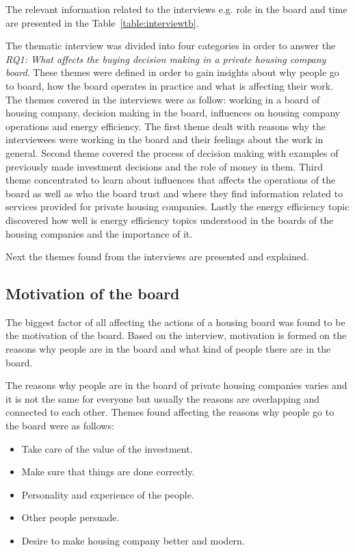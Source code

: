 The relevant information related to the interviews e.g. role in the board and time are presented in the Table~\ref{table:interviewtb}. 

The thematic interview was divided into four categories in order to answer the \emph{RQ1: What affects the buying decision making in a private housing company board}. These themes were defined in order to gain insights about why people go to board, how the board operates in practice and what is affecting their work. The themes covered in the interviews were as follow: working in a board of housing company, decision making in the board, influences on housing company operations and energy efficiency. The first theme dealt with reasons why the interviewees were working in the board and their feelings about the work in general. Second theme covered the process of decision making with examples of previously made investment decisions and the role of money in them. Third theme concentrated to learn about influences that affects the operations of the board as well as who the board trust and where they find information related to services provided for private housing companies. Lastly the energy efficiency topic discovered how well is energy efficiency topics understood in the boards of the housing companies and the importance of it.

Next the themes found from the interviews are presented and explained.

\subsection{Motivation of the board}

The biggest factor of all affecting the actions of a housing board was found to be the motivation of the board. Based on the interview, motivation is formed on the reasons why people are in the board and what kind of people there are in the board.

The reasons why people are in the board of private housing companies varies and it is not the same for everyone but usually the reasons are overlapping and connected to each other. Themes found affecting the reasons why people go to the board were as follows:
\begin{itemize}
	\setlength{\itemsep}{1pt}
	\item Take care of the value of the investment.
	\item Make sure that things are done correctly.
	\item Personality and experience of the people.
	\item Other people persuade.
	\item Desire to make housing company better and modern.
\end{itemize}

